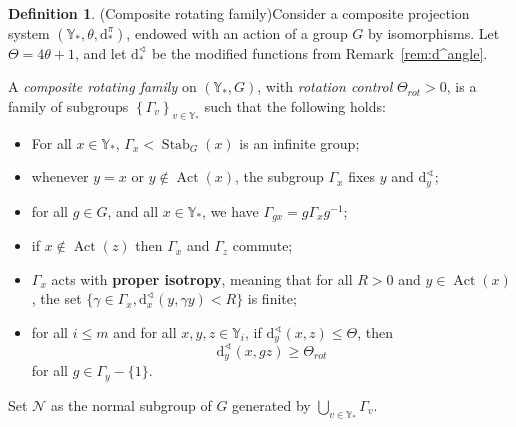 \documentclass[svgnames]{amsart}
\theoremstyle{plain}
\theoremstyle{definition}
\newtheorem{defn}[thm]{Definition}
\newcommand{\dist}{\mathrm{d}}
\newcommand{\Stab}[2]{\operatorname{Stab}_{#1}(#2)}
\newcommand{\Act}{\operatorname{Act}}
\newcommand{\N}{\mathcal{N}}
\renewcommand{\angle}{\sphericalangle}
\begin{document}
\begin{defn}(Composite rotating family)\label{def;CRF}
	Consider a composite projection system $(\mathbb{Y}_*, \theta,\dist^\pi_*)$, endowed with an action of a group $G$ by isomorphisms. Let $\Theta=4\theta+1$, and let $\dist^\angle_*$ be the modified functions from Remark~\ref{rem:d^angle}. 
    
    A \emph{composite rotating family} on  $(\mathbb{Y}_*,G)$, with \emph{rotation control} $\Theta_{rot}>0$, is a family of subgroups $\left\{\Gamma_v\right\}_{v\in \mathbb{Y}_*}$ such that the following holds: 
	\begin{itemize}
		\item For all $x\in \mathbb{Y}_*$, $\Gamma_x <  \Stab{G}{x}$ is an infinite group;
		\item whenever $y=x$ or $y\not\in\Act(x)$, the subgroup $\Gamma_x$ fixes $y$ and $\dist^\angle_y$;
		\item for all $g\in G$, and all $x\in \mathbb{Y}_*$, we have $\Gamma_{gx}= g\Gamma_x g^{-1}$;
		\item if $x\notin \Act(z)$ then $\Gamma_x$ and $\Gamma_z$ commute;
        \item $\Gamma_x$ acts with \textbf{proper isotropy}, meaning that for all $R>0$ and $y \in \Act(x)$, the set  $\{\gamma \in \Gamma_x, \dist_x^\angle (y, \gamma y) <R\}$ is finite;
		\item for all $i\leq m$ and for all $x,y, z \in \mathbb{Y}_i$, if $\dist^\angle_y(x,z)\leq \Theta$, then $$\dist^\angle_y(x,gz) \geq \Theta_{rot}$$ for all
		$g\in \Gamma_y-\{1\}$.
	\end{itemize}
    Set $\N$ as the normal subgroup of $G$ generated by $\bigcup_{v\in \mathbb{Y}_*}\Gamma_v$.
\end{defn}
\end{document}
